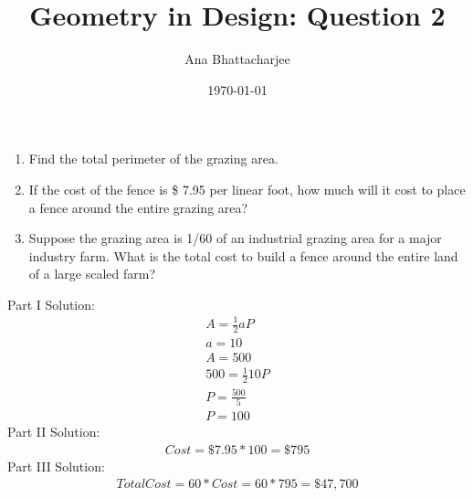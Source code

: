 \documentclass{article}
\begin{document}
\title{Geometry in Design: Question 2}
\author{Ana Bhattacharjee}
\date{\today}
\maketitle{}

\begin{center}
\begin{enumerate}[label=\roman*]
  \item Find the total perimeter of the grazing area.
  \item If the cost of the fence is \$ 7.95 per linear foot, how much will it cost to place a fence around the entire grazing area?
  \item Suppose the grazing area is 1/60 of an industrial grazing area for a major industry farm. What is the total cost to build a fence around the entire land of a large scaled farm?
\end{enumerate}
Part I Solution:
\begin{align}
  A = \frac{1}{2}aP \\
  a = 10 \\
  A = 500 \\
  500 = \frac{1}{2}10P \\
  P = \frac{500}{5} \\
  P = 100
\end{align}
Part II Solution:
\begin{align}
  Cost = \$7.95 * 100 = \$795
\end{align}
Part III Solution:
\begin{align}
  Total Cost = 60 * Cost = 60 * 795 = \$ 47,700 
\end{align}
\end{center}
\end{document}
